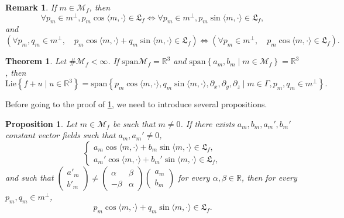 \documentclass[10pt]{article}
\newcommand{\p}{\partial}
\newcommand{\R}{{\mathbb R}}
\newcommand{\M}{{\mathcal M}}
\newcommand{\la}{\langle}
\newcommand{\ra}{\rangle}
\newtheorem{theorem}{Theorem}
\newtheorem{prop}{Proposition}
\newtheorem{rem}{Remark}
\begin{document}
    \begin{rem} \label{T3 rem equivalences}
    If $m\in \M_f$, then 
    \begin{equation*}
        \forall p_m \in m^{\perp}, p_m \cos \la m,\cdot \ra \in \mathfrak{L}_f \iff \forall p_m \in m^{\perp}, p_m\sin \la m,\cdot \ra \in \mathfrak{L}_f,
    \end{equation*}
    and 
    \begin{equation*}
        (\forall p_m,q_m\in m^{\perp}, \quad p_m\cos\la m,\cdot \ra +q_m \sin \la m,\cdot \ra\in \mathfrak{L}_f) \iff(\forall p_m\in m^{\perp}, \quad p_m\cos \la m,\cdot \ra\in \mathfrak{L}_f  ). 
    \end{equation*}
\end{rem}

\begin{theorem} \label{theorem : algebra dim3 span3}
    Let $\# \M_f < \infty$. If $\mathrm{span}\M_f=\R^3$ and $\mathrm{span}\left\{a_m,b_m \mid m \in \M_f\right\}=\R^3$,
    then  
    \begin{equation*}
        \mathrm{Lie}\left\{f+u \mid u \in \R^3\right\}=\mathrm{span} \left\{p_m\cos\la m,\cdot \ra,q_m\sin\la m,\cdot\ra,\p_x,\p_y,\p_z \mid m\in \Gamma,p_m,q_m \in m^{\perp}\right\}.
    \end{equation*}
\end{theorem}

Before going to the proof of \cref{theorem : algebra dim3 span3}, we need to introduce several propositions.

\begin{prop} \label{adding modes : different angles}
    Let $m\in \M_f$ be such that $m\neq 0$. If there exists $a_m,b_m,a_m',b_m'$ constant vector fields such that $a_m,a_m'\neq 0$,
    \begin{equation*}
        \left\{\begin{array}{cc}
           a_m\cos \la m,\cdot\ra+b_m \sin \la m,\cdot \ra \in \mathfrak{L}_f,    \\
        a_m'\cos\la m,\cdot \ra+b_m'\sin \la m,\cdot \ra\in \mathfrak{L}_f,
        \end{array}\right.
    \end{equation*}
    and such that $\begin{pmatrix}
            a'_m \\
            b'_m
        \end{pmatrix}\neq \begin{pmatrix}
            \alpha & \beta\\
            -\beta & \alpha 
        \end{pmatrix}\begin{pmatrix}
            a_m\\
            b_m
        \end{pmatrix}$ for every $\alpha,\beta\in \R$, then for every $p_m,q_m\in m^{\perp}$,
    \begin{equation*}
        p_m\cos \la m,\cdot \ra + q_m \sin \la m,\cdot \ra \in \mathfrak{L}_f.
    \end{equation*}
\end{prop}
\end{document}
